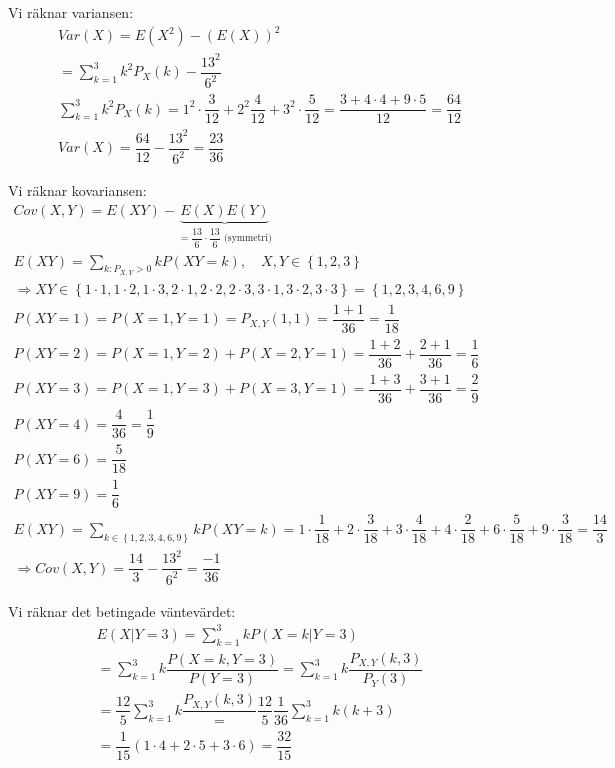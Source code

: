 \noindent Vi räknar variansen:
\begin{equation*}
  \begin{gathered}
    Var(X) = E(X^2)-(E(X))^2\\
    = \sum_{k=1}^{3}k^2P_X(k)-\dfrac{13^2}{6^2}\\
    \sum_{k=1}^{3}k^2P_X(k) = 1^2\cdot\dfrac{3}{12}+2^2\dfrac{4}{12}+3^2\cdot\dfrac{5}{12} = \dfrac{3+4\cdot4+9\cdot5}{12} = \dfrac{64}{12}\\
    Var(X) = \dfrac{64}{12}-\dfrac{13^2}{6^2} = \dfrac{23}{36}
  \end{gathered}
\end{equation*}
\par\bigskip
\noindent Vi räknar kovariansen:
\begin{equation*}
  \begin{gathered}
    Cov(X,Y) =  E(XY)-\underbrace{E(X)E(Y)}_{\text{$=\dfrac{13}{6}\cdot\dfrac{13}{6}$ (symmetri)}}\\
    E(XY) = \sum_{k:P_{X,Y}>0}kP(XY=k),\quad X,Y\in\left\{1,2,3\right\}\\
    \Rightarrow XY\in\left\{1\cdot1,1\cdot2,1\cdot3,2\cdot1,2\cdot2,2\cdot3,3\cdot1,3\cdot2,3\cdot3\right\} = \left\{1,2,3,4,6,9\right\}\\
    P(XY=1) = P(X=1,Y=1) = P_{X,Y}(1,1)  = \dfrac{1+1}{36} = \dfrac{1}{18}\\
    P(XY=2) = P(X=1,Y=2) + P(X=2,Y=1) = \dfrac{1+2}{36}+\dfrac{2+1}{36} = \dfrac{1}{6}\\
    P(XY=3) = P(X=1,Y=3)+P(X=3,Y=1) = \dfrac{1+3}{36}+\dfrac{3+1}{36} = \dfrac{2}{9}\\
    P(XY=4)=\dfrac{4}{36} = \dfrac{1}{9}\\
    P(XY=6) = \dfrac{5}{18}\\
    P(XY=9) = \dfrac{1}{6}\\
  E(XY) = \sum_{k\in\left\{1,2,3,4,6,9\right\}}kP(XY=k) = 1\cdot\dfrac{1}{18}+2\cdot\dfrac{3}{18}+3\cdot\dfrac{4}{18}+4\cdot\dfrac{2}{18}+6\cdot\dfrac{5}{18}+9\cdot\dfrac{3}{18} = \dfrac{14}{3}\\
    \Rightarrow Cov(X,Y) = \dfrac{14}{3}-\dfrac{13^2}{6^2} = \dfrac{-1}{36}
  \end{gathered}
\end{equation*}
\par\bigskip
\noindent Vi räknar det betingade väntevärdet:
\begin{equation*}
  \begin{gathered}
    E(X|Y=3) = \sum_{k=1}^{3}kP(X=k|Y=3)\\
    = \sum_{k=1}^{3}k\dfrac{P(X=k,Y=3)}{P(Y=3)} = \sum_{k=1}^{3}k\dfrac{P_{X,Y}(k,3)}{P_Y(3)}\\
    = \dfrac{12}{5}\sum_{k=1}^{3}k\dfrac{P_{X,Y}(k,3)} = \dfrac{12}{5}\dfrac{1}{36}\sum_{k=1}^{3}k(k+3)\\
    = \dfrac{1}{15}\left(1\cdot4+2\cdot5+3\cdot6\right) = \dfrac{32}{15}
  \end{gathered}
\end{equation*}
